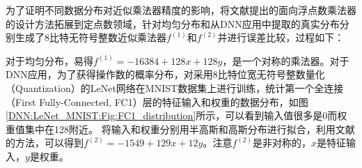为了证明不同数据分布对近似乘法器精度的影响，将文献\cite{AC:AM:OU}提出的面向浮点数乘法器的设计方法拓展到定点数领域，针对均匀分布和从DNN应用中提取的真实分布分别生成了8比特无符号整数近似乘法器$f^{(1)}$和$f^{(2)}$并进行误差比较，过程如下：

对于均匀分布，易得$f^{(1)} = -16384 + 128 x + 128 y$，是一个对称的乘法器。对于DNN应用，为了获得操作数的概率分布，对采用8比特位宽无符号整数量化（Quantization）的LeNet网络在MNIST数据集上进行训练\cite{DNN:LeNet_MNIST}，统计第一个全连接（First Fully-Connected, FC1）层的特征输入和权重的数据分布，如图\ref{DNN:LeNet_MNIST:Fig:FC1_distribution}所示，可以看到输入值很多是0而权重值集中在128附近。
将输入和权重分别用半高斯和高斯分布进行拟合，利用文献\cite{AC:AM:OU}的方法，可以得到$f^{(2)} = -1549 + 129 x + 12 y$。注意$f^{(2)}$是非对称的，$x$是特征输入，$y$是权重。

